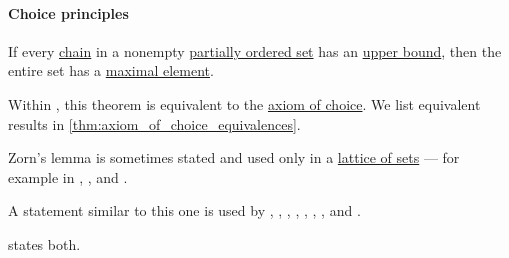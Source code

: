 \paragraph{Choice principles}

\begin{lemma}\label{thm:zorns_lemma}
  If every \hyperref[def:partial_order_connectedness/chain]{chain} in a nonempty \hyperref[def:partially_ordered_set]{partially ordered set} has an \hyperref[def:extremal_points/bounds]{upper bound}, then the entire set has a \hyperref[def:extremal_points/maximal_and_minimal_element]{maximal element}.
\end{lemma}
\begin{comments}
  \item Within \hyperref[def:zfc]{}, this theorem is equivalent to the \hyperref[def:zfc/choice]{axiom of choice}. We list equivalent results in \cref{thm:axiom_of_choice_equivalences}.

  \item Zorn's lemma is sometimes stated and used only in a \hyperref[def:lattice_of_sets]{lattice of sets} --- for example in
  \cite[117]{Grätzer2011LatticeTheory},
  \cite[thm. 6.4.34]{Hinman2005Logic},
  \cite[151]{Enderton1977SetTheory} and
  \cite[16]{КанторовичАкилов1984ФункциональныйАнализ}.

  A statement similar to this one is used by
  \cite[50]{Harzheim2005OrderedSets},
  \cite[33]{Kelley1975GeneralTopology},
  \cite[8]{Engelking1989GeneralTopology},
  \cite[lemma V.3.1]{Aluffi2009Algebra},
  \cite[880]{Lang2002Algebra},
  \cite[314]{Rotman2015AdvancedModernAlgebraPart1},
  \cite[117]{Гуров2013ТеорияРешёток},
  \cite[31]{Мальцев1970АлгебраическиеСистемы} and
  \cite[13]{Проданов1982ФункционаленАнализЧаст1}.

  \Textcite[2]{Jacobson1989BasicAlgebraII} states both.
\end{comments}
